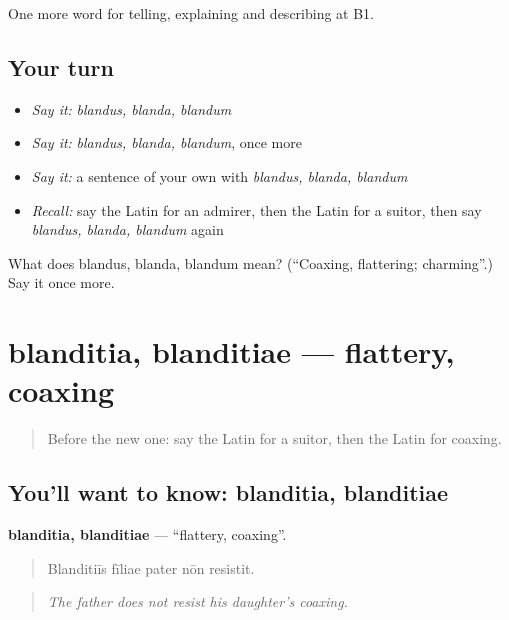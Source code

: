\begin{grammarlens}[title={What you've built}]
One more word for telling, explaining and describing at B1.
\end{grammarlens}

\subsection*{Your turn}
\begin{itemize}
\raggedright
  \item \emph{Say it:} \emph{blandus, blanda, blandum}
  \item \emph{Say it:} \emph{blandus, blanda, blandum}, once more
  \item \emph{Say it:} a sentence of your own with \emph{blandus, blanda, blandum}
  \item \emph{Recall:} say the Latin for an admirer, then the Latin for a suitor, then say \emph{blandus, blanda, blandum} again
\end{itemize}

\begin{tcolorbox}[breakable,colback=teal!4,colframe=teal!35!black,title={Before you move on}]
What does blandus, blanda, blandum mean? (\textquotedblleft{}Coaxing, flattering; charming\textquotedblright{}.) Say it once more.
\end{tcolorbox}
\section[blanditia, blanditiae]{blanditia, blanditiae — flattery, coaxing}

\label{lesson:LA-C536-blanditia}



\begin{quote}
Before the new one: say the Latin for a suitor, then the Latin for coaxing.
\end{quote}

\subsection*{You'll want to know: blanditia, blanditiae}
\textbf{blanditia, blanditiae} — \textquotedblleft{}flattery, coaxing\textquotedblright{}.

\begin{quote}
Blanditiīs fīliae pater nōn resistit.
\end{quote}

\begin{quote}
\emph{The father does not resist his daughter's coaxing.}
\end{quote}

